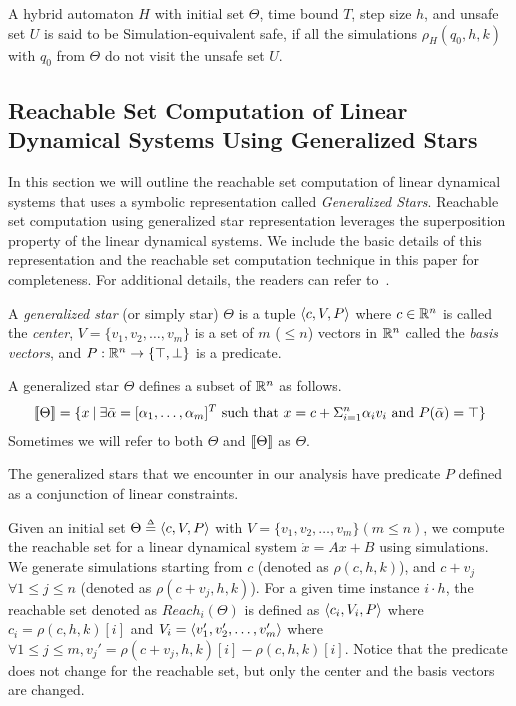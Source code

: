 \begin{definition}
\label{def:simSafe}
A hybrid automaton $H$ with initial set $\Theta$, time bound $T$, step size $h$, and unsafe set $U$ is said to be Simulation-equivalent safe, if all the simulations $\rho_{H}(q_0, h, k)$ with $q_0$ from $\Theta$ do not visit the unsafe set $U$.
\end{definition}


\subsection{Reachable Set Computation of Linear Dynamical Systems Using Generalized Stars}
\label{sec:reachStars}

In this section we will outline the reachable set computation of linear dynamical systems that uses a symbolic representation called \emph{Generalized Stars}.
%
Reachable set computation using generalized star representation leverages the superposition property of the linear dynamical systems.
%
We include the basic details of this representation and the reachable set computation technique in this paper for completeness. For additional details, the readers can refer to~\cite{}.


\begin{definition}
\label{def:genStar}
A \emph{generalized star} (or simply star) $\Theta$ is a tuple $\tup{c,V,P}$ where $c \in \reals^n$ is called the \emph{center}, $V = \{v_1,v_2,\ldots, v_m\}$ is a set of $m$ ($\leq n$) vectors in $\reals^n$ called the \emph{basis vectors}, and $P: \reals^n \rightarrow \{\top, \bot\}$ is a predicate.

A generalized star $\Theta$ defines a subset of $\reals^n$ as follows.
\begin{eqnarray*}
[\![ \Theta ]\!] = \{ x\: |\: \exists \bar{\alpha} = [\alpha_1, \ldots, \alpha_m]^T \mbox{ such that } x = c + \Sigma_{i=1}^n \alpha_i v_i \mbox{ and } P(\bar{\alpha}) = \top \}
\end{eqnarray*}
Sometimes we will refer to both $\Theta$ and $[\![ \Theta ]\!]$ as $\Theta$.
\end{definition}

The generalized stars that we encounter in our analysis have predicate $P$ defined as a conjunction of linear constraints.

Given an initial set $\Theta \deq \tup{c, V, P}$ with $V = \{v_1, v_2, \ldots, v_m\} (m \leq n)$, we compute the reachable set for a linear dynamical system $\dot{x} = Ax + B$ using simulations.
%
We generate simulations starting from $c$ (denoted as $\rho(c, h, k)$), and $c+v_j$ $\forall 1\leq j \leq n$ (denoted as $\rho(c+v_j, h, k)$). 
%
For a given time instance $i\cdot h$, the reachable set denoted as $Reach_i(\Theta)$ is defined as $\tup{c_i, V_i, P}$ where $c_i = \rho(c, h, k)[i]$ and $V_i = \tup{v_1', v_2', \ldots, v_m'}$ where $\forall 1\leq j \leq m, v_j' = \rho(c+v_j, h, k)[i] - \rho(c, h, k)[i]$. 
%
Notice that the predicate does not change for the reachable set, but only the center and the basis vectors are changed.
%

